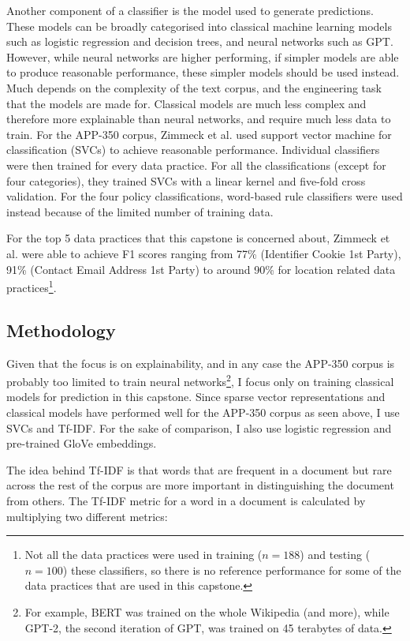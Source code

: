 Another component of a classifier is the model used to generate predictions. These models can be broadly categorised into classical machine learning models such as logistic regression and decision trees, and neural networks such as GPT. However, while neural networks are higher performing, if simpler models are able to produce reasonable performance, these simpler models should be used instead. Much depends on the complexity of the text corpus, and the engineering task that the models are made for. Classical models are much less complex and therefore more explainable than neural networks, and require much less data to train. For the APP-350 corpus, Zimmeck et al. used support vector machine for classification (SVCs) to achieve reasonable performance. Individual classifiers were then trained for every data practice. For all the classifications (except for four categories), they trained SVCs with a linear kernel and five-fold cross validation. For the four policy classifications, word-based rule classifiers were used instead because of the limited number of training data.

For the top 5 data practices that this capstone is concerned about, Zimmeck et al. were able to achieve F1 scores ranging from 77\% (Identifier Cookie 1st Party), 91\% (Contact Email Address 1st Party) to around 90\% for location related data practices\footnote{Not all the data practices were used in training ($n = 188$) and testing ($n = 100$) these classifiers, so there is no reference performance for some of the data practices that are used in this capstone.}.

\subsection{Methodology}
Given that the focus is on explainability, and in any case the APP-350 corpus is probably too limited to train neural networks\footnote{For example, BERT was trained on the whole Wikipedia (and more), while GPT-2, the second iteration of GPT, was trained on 45 terabytes of data.}, I focus only on training classical models for prediction in this capstone. Since sparse vector representations and classical models have performed well for the APP-350 corpus as seen above, I use SVCs and Tf-IDF. For the sake of comparison, I also use logistic regression and pre-trained GloVe embeddings.

The idea behind Tf-IDF is that words that are frequent in a document but rare across the rest of the corpus are more important in distinguishing the document from others. The Tf-IDF metric for a word in a document is calculated by multiplying two different metrics:

